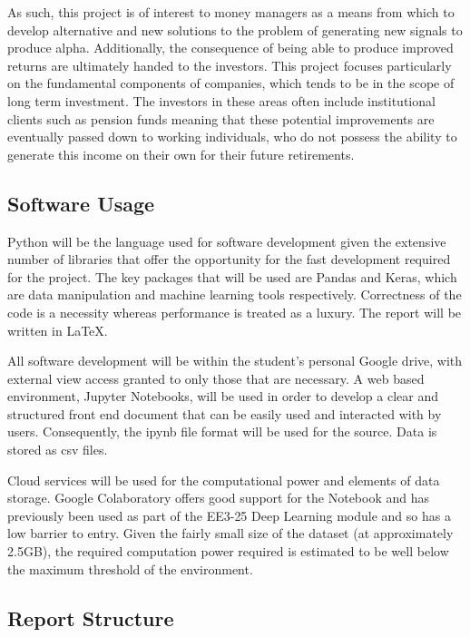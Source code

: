 \documentclass[10pt,onecolumn,letterpaper]{article}
\begin{document}
As such, this project is of interest to money managers as a means from which to develop alternative and new solutions to the problem of generating new signals to produce alpha. Additionally, the consequence of being able to produce improved returns are ultimately handed to the investors. This project focuses particularly on the fundamental components of companies, which tends to be in the scope of long term investment. The investors in these areas often include institutional clients such as pension funds meaning that these potential improvements are eventually passed down to working individuals, who do not possess the ability to generate this income on their own for their future retirements.  

\subsection{Software Usage} 

Python will be the language used for software development given the extensive number of libraries that offer the opportunity for the fast development required for the project. The key packages that will be used are Pandas and Keras, which are data manipulation and machine learning tools respectively. Correctness of the code is a necessity whereas performance is treated as a luxury. The report will be written in LaTeX. 

All software development will be within the student's personal Google drive, with external view access granted to only those that are necessary. A web based environment, Jupyter Notebooks\cite{jupyter_notebook}, will be used in order to develop a clear and structured front end document that can be easily used and interacted with by users. Consequently, the ipynb file format will be used for the source. Data is stored as csv files. 

Cloud services will be used for the computational power and elements of data storage. Google Colaboratory offers good support for the Notebook and has previously been used as part of the EE3-25 Deep Learning module and so has a low barrier to entry. Given the fairly small size of the dataset (at approximately 2.5GB), the required computation power required is estimated to be well below the maximum threshold of the environment. 

\subsection{Report Structure} \label{Report Structure}
\end{document}
